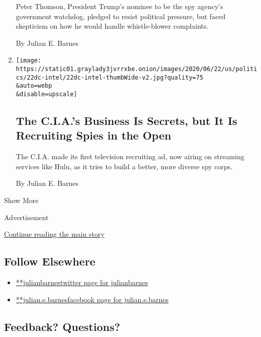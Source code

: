 \begin{enumerate}
  Peter Thomson, President Trump's nominee to be the spy agency's
  government watchdog, pledged to resist political pressure, but faced
  skepticism on how he would handle whistle-blower complaints.

  By Julian E. Barnes
\item
  \href{/2020/06/22/us/politics/cia-recruiting-ad.html}{}

  \texttt{[image: https://static01.graylady3jvrrxbe.onion/images/2020/06/22/us/politics/22dc-intel/22dc-intel-thumbWide-v2.jpg?quality=75\\\&auto=webp\\\&disable=upscale]}

  \hypertarget{the-cias-business-is-secrets-but-it-is-recruiting-spies-in-the-open}{%
  \subsection{The C.I.A.'s Business Is Secrets, but It Is Recruiting
  Spies in the
  Open}\label{the-cias-business-is-secrets-but-it-is-recruiting-spies-in-the-open}}

  The C.I.A. made its first television recruiting ad, now airing on
  streaming services like Hulu, as it tries to build a better, more
  diverse spy corps.

  By Julian E. Barnes
\end{enumerate}

Show More

Advertisement

\protect\hyperlink{after-mid2}{Continue reading the main story}

\hypertarget{follow-elsewhere}{%
\subsection{Follow Elsewhere}\label{follow-elsewhere}}

\begin{itemize}
\tightlist
\item
  \href{https://twitter.com/julianbarnes}{**julianbarnestwitter page for
  julianbarnes}
\item
  \href{https://www.facebookcorewwwi.onion/julian.e.barnes}{**julian.e.barnesfacebook
  page for julian.e.barnes}
\end{itemize}

\hypertarget{feedback-questions}{%
\subsection{Feedback? Questions?}\label{feedback-questions}}

